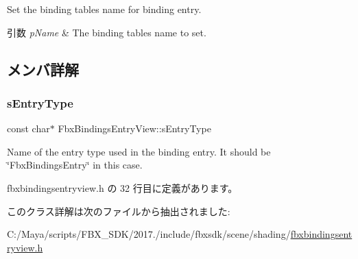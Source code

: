 Set the binding table\textquotesingle{}s name for binding entry. 
\begin{DoxyParams}{引数}
{\em p\+Name} & The binding table\textquotesingle{}s name to set. \\
\hline
\end{DoxyParams}


\subsection{メンバ詳解}
\mbox{\label{class_fbx_bindings_entry_view_a209f878b5007e944ca37fb6f73139c2e}} 
\subsubsection{\texorpdfstring{s\+Entry\+Type}{sEntryType}}
{\footnotesize\ttfamily const char$\ast$ Fbx\+Bindings\+Entry\+View\+::s\+Entry\+Type\hspace{0.3cm}{\ttfamily [static]}}

Name of the entry type used in the binding entry. It should be \char`\"{}\+Fbx\+Bindings\+Entry\char`\"{} in this case. 

 fbxbindingsentryview.\+h の 32 行目に定義があります。



このクラス詳解は次のファイルから抽出されました\+:\begin{DoxyCompactItemize}
\item 
C\+:/\+Maya/scripts/\+F\+B\+X\+\_\+\+S\+D\+K/2017./include/fbxsdk/scene/shading/\hyperlink{fbxbindingsentryview_8h}{fbxbindingsentryview.\+h}\end{DoxyCompactItemize}
